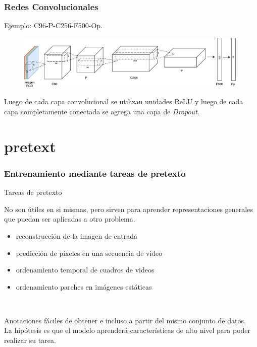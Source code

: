 \documentclass{beamer}
\begin{document}
\begin{frame}
\frametitle{Redes Convolucionales}
Ejemplo: C96-P-C256-F500-Op.
\vfill
\begin{figure}
    \centering
    \includegraphics[width=\textwidth]{images/net_example.pdf}
\end{figure}
\vfill
Luego de cada capa convolucional se utilizan unidades ReLU y luego de cada capa completamente conectada se agrega una capa de \textit{Dropout}.
\vfill
\end{frame}





\section{pretext}
\begin{frame}
\frametitle{Entrenamiento mediante tareas de pretexto}
Tareas de pretexto \\\vfill

No son útiles en si mismas, pero sirven para aprender representaciones generales que puedan ser aplicadas a otro problema.\\\vfill
	
\begin{itemize}
    \item reconstrucción de la imagen de entrada
    \item predicción de píxeles en una secuencia de video 
    \item ordenamiento temporal de cuadros de videos
    \item ordenamiento parches en imágenes estáticas
\end{itemize}\\
\vfill

Anotaciones fáciles de obtener e incluso a partir del mismo conjunto de datos. \\
\vfill
La hipótesis es que el modelo aprenderá características de alto nivel para poder realizar su tarea.
\vfill
\end{frame}
\end{document}
